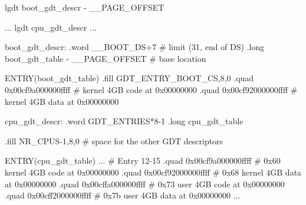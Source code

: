 \documentclass[varwidth,crop]{standalone}
\begin{document}
\begin{gascode}
    lgdt boot_gdt_descr - __PAGE_OFFSET

    ...
    lgdt cpu_gdt_descr
    ...
    
boot_gdt_descr:
    .word __BOOT_DS+7                     # limit (31, end of DS)
    .long boot_gdt_table - __PAGE_OFFSET  # base location

ENTRY(boot_gdt_table)
    .fill GDT_ENTRY_BOOT_CS,8,0
    .quad 0x00cf9a000000ffff  # kernel 4GB code at 0x00000000 
    .quad 0x00cf92000000ffff  # kernel 4GB data at 0x00000000 

cpu_gdt_descr:
    .word GDT_ENTRIES*8-1
    .long cpu_gdt_table

    .fill NR_CPUS-1,8,0       # space for the other GDT descriptors
        
ENTRY(cpu_gdt_table)
    ...
    # Entry 12-15 
    .quad 0x00cf9a000000ffff  # 0x60 kernel 4GB code at 0x00000000 
    .quad 0x00cf92000000ffff  # 0x68 kernel 4GB data at 0x00000000 
    .quad 0x00cffa000000ffff  # 0x73 user 4GB code at 0x00000000 
    .quad 0x00cff2000000ffff  # 0x7b user 4GB data at 0x00000000 
    ...
\end{gascode}
\end{document}
